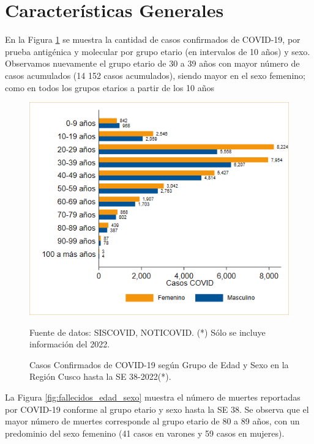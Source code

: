 \documentclass[12pt,a4paper,openany]{book}
\begin{document}
	
	\clearpage	
	\section*{Características Generales}
	
	
	
	\noindent En la Figura \ref{fig:casos_edad_sexo} se muestra la cantidad de casos confirmados de COVID-19, por prueba antigénica y molecular por grupo etario (en intervalos de 10 años) y sexo. Observamos nuevamente el grupo
	etario de 30 a 39 años con mayor número de casos acumulados (14 152 casos acumulados), siendo
	mayor en el sexo femenino; como en todos los grupos etarios a partir de los 10 años 
	
	
	\begin{figure}[h]
		\caption{Casos Confirmados de COVID-19 según Grupo de Edad y Sexo en la Región Cusco hasta la SE 38-2022(*).}\label{fig:casos_edad_sexo}
		\begin{center}
			\includegraphics[width=0.75\linewidth]{../figuras/casos_etapavida_2022}
		\end{center}
		{\footnotesize {Fuente de datos: SISCOVID, NOTICOVID. (*) Sólo se incluye información del 2022.}}
	\end{figure}
	\pagebreak
	
	
	La Figura \ref{fig:fallecidos_edad_sexo}  muestra el número de muertes reportadas por COVID-19 conforme al grupo etario y sexo hasta la SE 38.  Se observa que el mayor número de muertes corresponde al grupo etario de 80
	a 89 años, con un predominio del sexo femenino (41 casos en varones y 59 casos en mujeres).
	
\end{document}
